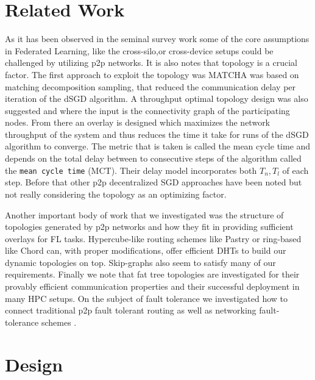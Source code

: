 \documentclass[12pt,notitlepage]{article}
\begin{document}
\section{Related Work}
As it has been observed in the seminal survey work \cite{fl-survey} some of 
the core assumptions in Federated Learning, like the cross-silo,or cross-device
setups could be challenged by utilizing p2p networks. It is also notes that
topology is a crucial factor. The first approach to exploit the topology was
MATCHA \cite{matcha} was based on matching decomposition sampling, that reduced
the communication delay per iteration of the dSGD algorithm. A throughput 
optimal topology design was also suggested \cite{marfoq2020throughputoptimal}
and where the input is the connectivity graph of the participating nodes.
From there an overlay is designed which maximizes the network throughput of
the system and thus reduces the time it take for runs of the dSGD algorithm
to converge. The metric that is taken is called the mean cycle time
and depends on the total delay between to consecutive steps of the algorithm
called the {\tt mean cycle time} (MCT). Their delay model incorporates
both $T_n, T_l$ of each step. Before that other p2p decentralized SGD 
approaches have been noted \cite{personal-private} but not really considering
the topology as an optimizing factor.

Another important body of work that we investigated was the structure of
topologies generated by p2p networks and how they fit in providing sufficient
overlays for FL tasks. Hypercube-like routing schemes like Pastry \cite{pastry}
 or ring-based like Chord \cite{chord} can, with proper modifications, offer
efficient DHTs to build our dynamic topologies on top. Skip-graphs 
\cite{skip-graphs} also seem to satisfy many of our requirements.
Finally we note that fat tree topologies \cite{fat-trees} are investigated 
for their provably efficient communication properties and their successful 
deployment in many HPC setups. On the subject of fault tolerance we investigated
how to connect traditional p2p fault tolerant routing as well as networking
fault-tolerance schemes \cite{fat-trees-fault}.

\section{Design}
\end{document}
